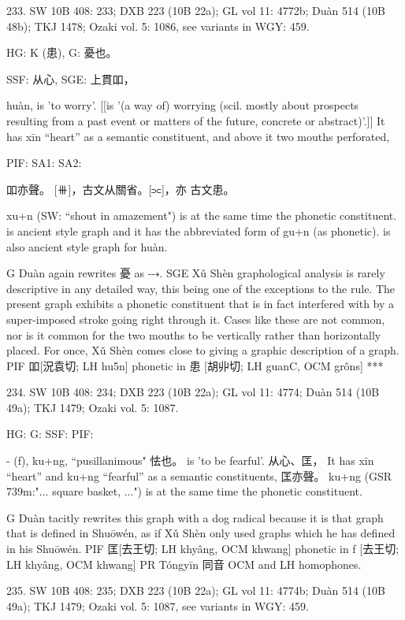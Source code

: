 233. SW 10B 408: 233; DXB 223 (10B 22a); GL vol 11: 4772b; Duàn 514 (10B 48b); TKJ 1478; Ozaki vol. 5: 1086, see
variants in WGY: 459.

HG:  K (患),
G:	憂也。

SSF: 从心,
SGE: 上貫吅，


huàn,
is 'to worry'. [[is '(a way of) worrying (scil. mostly about prospects resulting from a past event or matters of the future, concrete or abstract)'.]]
It has xīn ``heart'' as a semantic constituent, and above it two mouths perforated,

PIF: SA1: SA2:

吅亦聲。
   [⧻]，古文从關省。[⫗]，亦
古文患。

xu+n (SW: ``shout in amazement") is at the same time the phonetic constituent.
  is ancient style graph and it has the abbreviated form of
gu+n (as phonetic).
is also ancient style graph for huàn.

G	Duàn again rewrites 憂 as ⤏.
SGE Xǔ Shèn graphological analysis is rarely descriptive in any detailed way, this being one of the exceptions to the rule. The present graph exhibits a phonetic constituent that is in fact interfered with by a super-imposed stroke going right through it. Cases like these are not common, nor is it common for the two mouths to be vertically rather than horizontally placed. For once, Xǔ Shèn comes close to giving a graphic description of a graph.
PIF     吅[況袁切; LH hu5n] phonetic in 患 [胡丱切; LH guanC, OCM grôns]
***



234. SW 10B 408: 234; DXB 223 (10B 22a); GL vol 11: 4774; Duàn 514 (10B 49a); TKJ 1479; Ozaki vol. 5: 1087.


HG:
G: SSF: PIF:

- (ƒ),	ku+ng, ``pusillanimous"
怯也。	is 'to be fearful'.
从心、匡， It has xīn ``heart'' and ku+ng ``fearful'' as a semantic constituents,
匡亦聲。 ku+ng (GSR 739m:"... square basket, ...") is at the same time the phonetic constituent.

G	Duàn tacitly rewrites this graph with a dog radical because it is that graph that is defined in
Shuōwén, as if Xǔ Shèn only used graphs which he has defined in his Shuōwén.
PIF     匡[去王切; LH khyâng, OCM khwang] phonetic in ƒ [去王切; LH khyâng, OCM khwang]
PR	Tóngyīn 同音 OCM and LH homophones.

235. SW 10B 408: 235; DXB 223 (10B 22a); GL vol 11: 4774b; Duàn 514 (10B 49a); TKJ 1479; Ozaki vol. 5: 1087, see
variants in WGY: 459.



